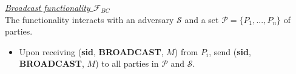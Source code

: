 \begin{tcolorbox}[colback=white, arc=5pt]
    \noindent\emph{\underline{Broadcast functionality $\mathcal{F}_{BC}$}}\\[5pt]
    The functionality interacts with an adversary $\mathcal{S}$ and a set $\mathcal{P}=\{P_1,...,P_n\}$ of parties.
    \begin{itemize}
        \item Upon receiving (\textbf{sid}, \textbf{BROADCAST}, $M$) from $P_i$, send (\textbf{sid}, \textbf{BROADCAST}, $M$) to all parties in $\mathcal{P}$ and $\mathcal{S}$.
    \end{itemize}
    
    \end{tcolorbox}
    \label{fig:bc_functionality}